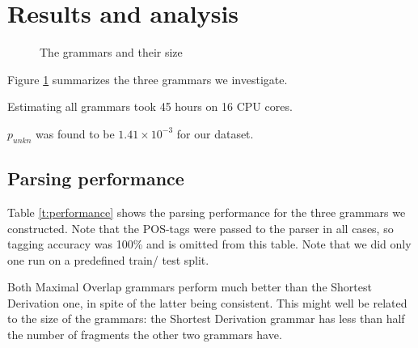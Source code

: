 \section{Results and analysis}\label{sec:Results}
\begin{figure}[h!]
\caption{The grammars and their size}
\label{f:grammars}
\end{figure}

Figure \ref{f:grammars} summarizes the three grammars we investigate. 

Estimating all grammars took 45 hours on 16 CPU cores.



$p_{unkn}$ was found to be $1.41\times 10^{-3}$ for our dataset.%

\subsection{Parsing performance}

\begin{table}
\center

\label{t:performance}
\end{table}

Table \ref{t:performance} shows the parsing performance for the three grammars we constructed. Note that the POS-tags were passed to the parser in all cases, so tagging accuracy was 100\% and is omitted from this table. 
Note that we did only one run on a predefined train/ test split.

Both Maximal Overlap grammars perform much better than the Shortest Derivation one, in spite of the latter being consistent. 
This might well be related to the size of the grammars: the Shortest Derivation grammar has less than half the number of fragments the other two grammars have. 

